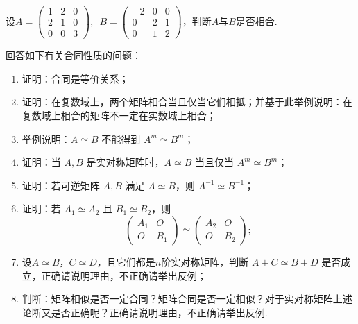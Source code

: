 \begin{exercise}

    \begin{exgroup}
        \item 设$A=\begin{pmatrix}
            1 & 2 & 0 \\ 2 & 1 & 0 \\ 0 & 0 & 3
        \end{pmatrix},\enspace B=\begin{pmatrix}
            -2 & 0 & 0 \\ 0 & 2 & 1 \\ 0 & 1 & 2
        \end{pmatrix}$，判断$A$与$B$是否相合.

        \item 回答如下有关合同性质的问题：
        \begin{enumerate}
            \item 证明：合同是等价关系；
            \item 证明：在复数域上，两个矩阵相合当且仅当它们相抵；并基于此举例说明：在复数域上相合的矩阵不一定在实数域上相合；
            \item 举例说明：$A \simeq B$ 不能得到 $A^m \simeq B^m$；
            \item 证明：当 $A,B$ 是实对称矩阵时，$A\simeq B$ 当且仅当 $A^m\simeq B^m$；
            \item 证明：若可逆矩阵 $A, B$ 满足 $A\simeq B$，则 $A^{-1}\simeq B^{-1}$；
            \item 证明：若 $A_1\simeq A_2$ 且 $B_1\simeq B_2$，则
                  \[
                      \begin{pmatrix}
                          A_1 & O \\ O & B_1
                      \end{pmatrix}\simeq\begin{pmatrix}
                          A_2 & O \\ O & B_2
                      \end{pmatrix};
                  \]
            \item 设$A\simeq B$，$C\simeq D$，且它们都是$n$阶实对称矩阵，判断 $A+C\simeq B+D$ 是否成立，正确请说明理由，不正确请举出反例；
            \item  判断：矩阵相似是否一定合同？矩阵合同是否一定相似？对于实对称矩阵上述论断又是否正确呢？正确请说明理由，不正确请举出反例.
        \end{enumerate}
    \end{exgroup}


\end{exercise}
